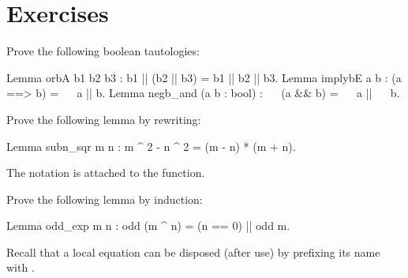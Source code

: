 %
%


\newpage
\section{Exercises}

\begin{Exercise}[label=ex:boolid,difficulty=0,title={Truth tables}]

Prove the following boolean tautologies:

\begin{coq}{}{}
Lemma orbA b1 b2 b3 : b1 || (b2 || b3) = b1 || b2 || b3.
Lemma implybE a b : (a ==> b) = ~~ a || b.
Lemma negb_and (a b : bool) : ~~ (a && b) = ~~ a || ~~ b.
\end{coq}

\end{Exercise}

\begin{Exercise}[label=ex:rewrite,difficulty=0,title={Rewriting}]

Prove the following lemma by rewriting:

\begin{coq}{}{}
Lemma subn_sqr m n : m ^ 2 - n ^ 2 = (m - n) * (m + n).
\end{coq}
The \C{(_ ^ _)} notation is attached to the  function.

\end{Exercise}

\begin{Exercise}[label=ex:induction,difficulty=1,title={Induction}]

Prove the following lemma by induction:

\begin{coq}{}{}
Lemma odd_exp m n : odd (m ^ n) = (n == 0) || odd m.
\end{coq}
Recall that a local equation can be disposed (after use)
by prefixing its name with \C{\{\}}.

\end{Exercise}


